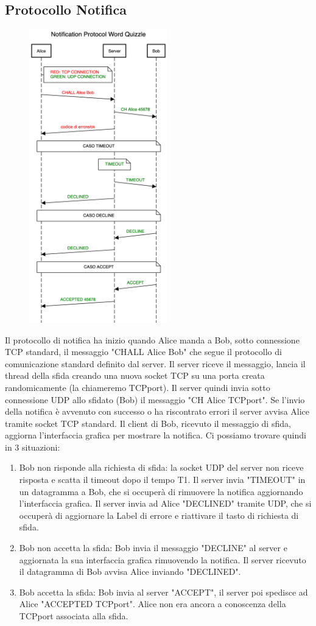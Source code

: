 \documentclass{article}
\begin{document}
\subsection{Protocollo Notifica}
\begin{figure}
\centering
\includegraphics[width=6cm]{chprotocolscheme.png}
\end{figure}
Il protocollo di notifica ha inizio quando Alice manda a Bob, sotto connessione TCP standard, il messaggio "CHALL Alice Bob" che segue il protocollo di comunicazione standard definito dal server. Il server riceve il messaggio, lancia il thread della sfida creando una nuova socket TCP su una porta creata randomicamente (la chiameremo TCPport). Il server quindi invia sotto connessione UDP allo sfidato (Bob) il messaggio "CH Alice TCPport". Se l'invio della notifica è avvenuto con successo o ha riscontrato errori il server avvisa Alice tramite socket TCP standard. Il client di Bob, ricevuto il messaggio di sfida, aggiorna l'interfaccia grafica per mostrare la notifica.
Ci possiamo trovare quindi in 3 situazioni:
\begin{enumerate}
  \item Bob non risponde alla richiesta di sfida: la socket UDP del server non riceve risposta e scatta il timeout dopo il tempo T1. Il server invia "TIMEOUT" in un datagramma a Bob, che si occuperà di rimuovere la notifica aggiornando l'interfaccia grafica. Il server invia ad Alice "DECLINED" tramite UDP, che si occuperà di aggiornare la Label di errore e riattivare il tasto di richiesta di sfida.
  \item Bob non accetta la sfida: Bob invia il messaggio "DECLINE" al server e aggiornata la sua interfaccia grafica rimuovendo la notifica. Il server ricevuto il datagramma di Bob avvisa Alice inviando "DECLINED".
  \item Bob accetta la sfida: Bob invia al server "ACCEPT", il server poi spedisce ad Alice "ACCEPTED TCPport". Alice non era ancora a conoscenza della TCPport associata alla sfida.
\end{enumerate}
\end{document}
